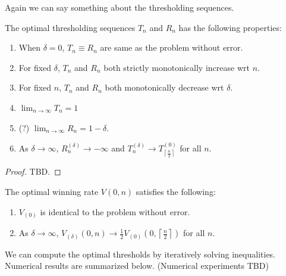 Again we can say something about the thresholding sequences.

\begin{theorem}
	The optimal thresholding sequences $T_n$ and $R_n$ has the following properties:
	\begin{enumerate}
		\item When $\delta = 0$, $T_n \equiv R_n$ are same as the problem without error.
		 \item For fixed $\delta$,  $T_n$ and $R_n$ both strictly monotonically increase wrt $n$.
		 \item For fixed $n$, $T_n$ and $R_n$ both monotonically decrease wrt $\delta$.
		\item  $\lim_{n \to \infty} T_n = 1$
		\item (?) $\lim_{n \to \infty} R_n = 1-\delta$.
		\item As $\delta \to \infty$, $R_n^{(\delta)} \to  -\infty$ and $T_n^{(\delta)} \to  T_{\left\lceil \frac{n}{2} \right\rceil }^{(0)}$ for all $n$.
	\end{enumerate}
\end{theorem}
\begin{proof}
	TBD.
\end{proof}

\begin{corollary}
	The optimal winning rate $V(0,n)$ satisfies the following:
	\begin{enumerate}
		\item $V_{(0)}$ is identical to the problem without error.
		\item As $\delta \to \infty$, $V_{(\delta)}(0,n) \to \frac{1}{2} V_{(0)}(0,\left\lceil \frac{n}{2} \right\rceil )$ for all $n$.
	\end{enumerate}
\end{corollary}

We can compute the optimal thresholds by iteratively solving inequalities. Numerical results are summarized below. 
(Numerical experiments TBD)

	
